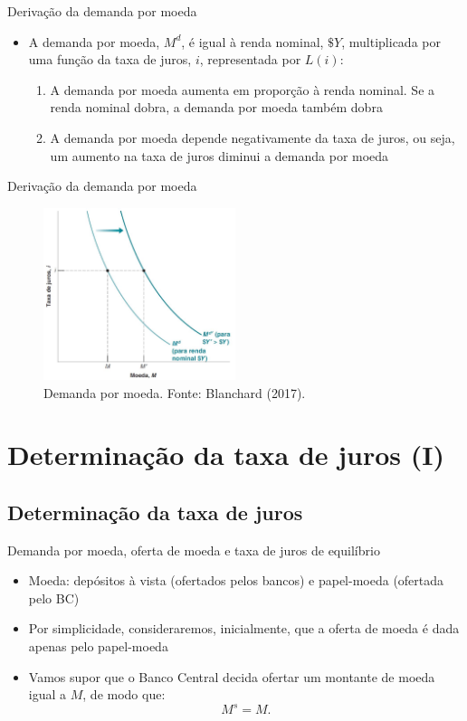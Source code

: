 \documentclass[10pt]{beamer}
\begin{document}
\begin{frame}{Derivação da demanda por moeda}
    \begin{itemize}
        \item A demanda por moeda, $M^d$, é igual à renda nominal, $\$Y$, multiplicada por uma função da taxa de juros, $i$, representada por $L(i)$:
        \bigskip
        \begin{enumerate}
            \item A demanda por moeda aumenta em proporção à renda nominal. Se a renda nominal dobra, a demanda por moeda também dobra
            \bigskip
            \item A demanda por moeda depende negativamente da taxa de juros, ou seja, um aumento na taxa de juros diminui a demanda por moeda
        \end{enumerate}
    \end{itemize}
\end{frame}

\begin{frame}{Derivação da demanda por moeda}
    \begin{figure}
        \centering
        \includegraphics[width=0.5\textwidth]{./figures/aula072_fig1.JPG}
        \caption{Demanda por moeda. Fonte: Blanchard (2017).}
        \label{fig1}
    \end{figure}
\end{frame}

\section{Determinação da taxa de juros (I)}
\subsection{Determinação da taxa de juros}
\begin{frame}{Demanda por moeda, oferta de moeda e taxa de juros de equilíbrio}
    \begin{itemize}
        \item Moeda: depósitos à vista (ofertados pelos bancos) e papel-moeda (ofertada pelo BC)
        \bigskip
        \item Por simplicidade, consideraremos, inicialmente, que a oferta de moeda é dada apenas pelo papel-moeda
        \bigskip
        \item Vamos supor que o Banco Central decida ofertar um montante de moeda igual a $M$, de modo que:
        \[
        M^s = M.
        \]
    \end{itemize}
\end{frame}
\end{document}

